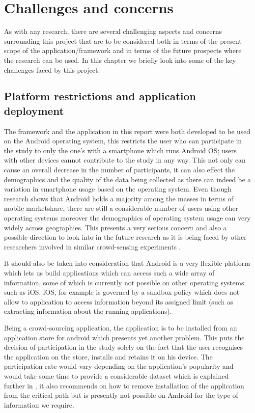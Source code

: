 \documentclass[12pt]{report}
\begin{document}
\chapter{Challenges and concerns}
\label{challenges}

As with any research, there are several challenging aspects and concerns surrounding this project that are to be considered both in terms of the present scope of the application/framework and in terms of the future prospects where the research can be used. In this chapter we briefly look into some of the key challenges faced by this project.

\section{Platform restrictions and application deployment}
\label{PlatformDeployment}
The framework and the application in this report were both developed to be used on the Android operating system, this restricts the user who can participate in the study to only the one's with a smartphone which runs Android OS; users with other devices cannot contribute to the study in any way. This not only can cause an overall decrease in the number of participants, it can also effect the demographics and the quality of the data being collected as there can indeed be a variation in smartphone usage based on the operating system. Even though research \cite{gartnerMobileSurvey2013} shows that Android holds a majority among the masses in terms of mobile marketshare, there are still a considerable number of users using other operating systems moreover the demographics of operating system usage can very widely across geographies. This presents a very serious concern and also a possible direction to look into in the future research as it is being faced by other researchers involved in similar crowd-sensing experiments \cite{balan2011real}. 

It should also be taken into consideration that Android is a very flexible platform which lets us build applications which can access such a wide array of information, some of which is currently not possible on other operating systems such as iOS. iOS, for example is governed by a sandbox policy \cite{AppleiOSPolicy} which does not allow to application to access information beyond its assigned limit (such as extracting information about the running applications).

Being a crowd-sourcing application, the application is to be installed from an application store for android which presents yet another problem. This puts the decision of participation in the study solely on the fact that the user recognises the application on the store, installs and retains it on his device. The participation rate would vary depending on the application's popularity and would take some time to provide a considerable dataset which is explained further in \cite{xiao2013lowering}, it also recommends on how to remove installation of the application from the critical path but is presently not possible on Android for the type of information we require.
\end{document}
